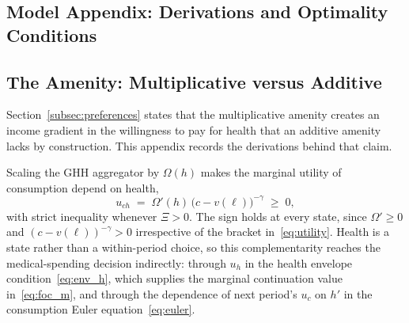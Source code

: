 \documentclass[12pt,a4paper]{article}
\begin{document}
\begin{appendices}

\section{Model Appendix: Derivations and Optimality Conditions}
\label{app:model}

\subsection{The Amenity: Multiplicative versus Additive}
\label{app:amenity}

Section~\ref{subsec:preferences} states that the multiplicative amenity creates an income gradient in the willingness to pay for health that an additive amenity lacks by construction. This appendix records the derivations behind that claim.

Scaling the GHH aggregator by $\Omega(h)$ makes the marginal utility of consumption depend on health,
\begin{equation}
\label{eq:u_ch}
u_{ch} \;=\; \Omega'(h)\,\bigl(c-v(\ell)\bigr)^{-\gamma} \;\geq\; 0,
\end{equation}
with strict inequality whenever $\Xi > 0$. The sign holds at every state, since $\Omega' \geq 0$ and $(c - v(\ell))^{-\gamma} > 0$ irrespective of the bracket in~\eqref{eq:utility}. Health is a state rather than a within-period choice, so this complementarity reaches the medical-spending decision indirectly: through $u_h$ in the health envelope condition~\eqref{eq:env_h}, which supplies the marginal continuation value in~\eqref{eq:foc_m}, and through the dependence of next period's $u_c$ on $h'$ in the consumption Euler equation~\eqref{eq:euler}.


\end{appendices}
\end{document}
